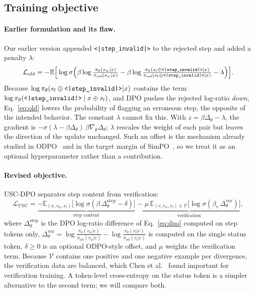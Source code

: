 \documentclass[11pt, a4paper]{article}
\newcommand{\invalid}{\texttt{<|step\_\allowbreak invalid|>}}
\begin{document}
\subsection{Training objective}
\label{sec:loss}
\paragraph{Earlier formulation and its flaw.} Our earlier version appended \invalid{} to the rejected step and added a penalty $\lambda$:
\begin{equation}
\mathcal{L}_{\text{old}}=-\mathbb{E}\Big[\log\sigma\Big(\beta\log\tfrac{\pi_\theta(s_w|x)}{\pi_{\text{ref}}(s_w|x)}-\beta\log\tfrac{\pi_\theta(s_l\oplus\invalid|x)}{\pi_{\text{ref}}(s_l\oplus\invalid|x)}-\lambda\Big)\Big].
\label{eq:old}
\end{equation}
Because $\log\pi_\theta(s_l\oplus\invalid|x)$ contains the term $\log\pi_\theta(\invalid\mid x\oplus s_l)$, and DPO pushes the rejected log-ratio \emph{down}, Eq.~\eqref{eq:old} lowers the probability of flagging an erroneous step, the opposite of the intended behavior. The constant $\lambda$ cannot fix this. With $z=\beta\Delta_\theta-\lambda$, the gradient is $-\sigma(\lambda-\beta\Delta_\theta)\,\beta\nabla_\theta\Delta_\theta$; $\lambda$ rescales the weight of each pair but leaves the direction of the update unchanged. Such an offset is the mechanism already studied in ODPO~\cite{amini2024odpo} and in the target margin of SimPO~\cite{meng2024simpo}, so we treat it as an optional hyperparameter rather than a contribution.

\paragraph{Revised objective.} USC-DPO separates step content from verification:
\begin{equation}
\mathcal{L}_{\text{USC}}=\underbrace{-\mathbb{E}_{(x,s_w,s_l)}\big[\log\sigma(\beta\,\Delta^{\text{step}}_\theta-\delta)\big]}_{\text{step content}}
\;\underbrace{-\;\mu\,\mathbb{E}_{(c,v_w,v_l)\in\mathcal{V}}\big[\log\sigma(\beta_v\,\Delta^{\text{ver}}_\theta)\big]}_{\text{verification}},
\label{eq:usc}
\end{equation}
where $\Delta^{\text{step}}_\theta$ is the DPO log-ratio difference of Eq.~\eqref{eq:dpo} computed on step tokens only, $\Delta^{\text{ver}}_\theta=\log\frac{\pi_\theta(v_w|c)}{\pi_{\text{ref}}(v_w|c)}-\log\frac{\pi_\theta(v_l|c)}{\pi_{\text{ref}}(v_l|c)}$ is computed on the single status token, $\delta\ge 0$ is an optional ODPO-style offset, and $\mu$ weights the verification term. Because $\mathcal{V}$ contains one positive and one negative example per divergence, the verification data are balanced, which Chen et al.~\cite{chen2026selfverify} found important for verification training. A token-level cross-entropy on the status token is a simpler alternative to the second term; we will compare both.
\end{document}

